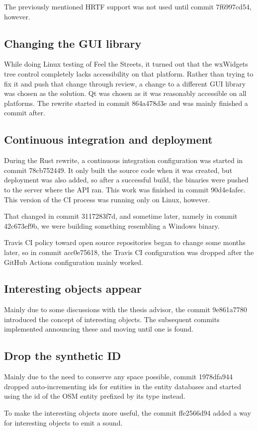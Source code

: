\documentclass[nolof,digital]{fithesis3}
\begin{document}
The previously mentioned HRTF support was not used until commit 7f6997cd54, however.
\subsection{Changing the GUI library}
While doing Linux testing of Feel the Streets, it turned out that the wxWidgets tree control completely lacks accessibility on that platform. Rather than trying to fix it and push that change through review, a change to a different GUI library was chosen as the solution. Qt was chosen as it was reasonably accessible on all platforms. The rewrite started in commit 864a478d3e and was mainly finished a commit after.
\subsection{Continuous integration and deployment}
During the Rust rewrite, a continuous integration configuration was started in commit 78cb752449. It only built the source code when it was created, but deployment was also added, so after a successful build, the binaries were pushed to the server where the API ran. This work was finished in commit 90d4e4afec. This version of the CI process was running only on Linux, however.

That changed in commit 3117283f7d, and sometime later, namely in commit 42c673ef9b, we were building something resembling a Windows binary.

Travis CI policy toward open source repositories began to change some months later, so in commit acc0e75618, the Travis CI configuration was dropped after the GitHub Actions configuration mainly worked.
\subsection{Interesting objects appear}
Mainly due to some discussions with the thesis advisor, the commit 9e861a7780 introduced the concept of interesting objects. The subsequent commits implemented announcing these and moving until one is found.
\subsection{Drop the synthetic ID}
Mainly due to the need to conserve any space possible, commit 1978dfa944 dropped auto-incrementing ids for entities in the entity databases and started using the id of the OSM entity prefixed by its type instead.

To make the interesting objects more useful, the commit ffe2566d94 added a way for interesting objects to emit a sound.
\end{document}
